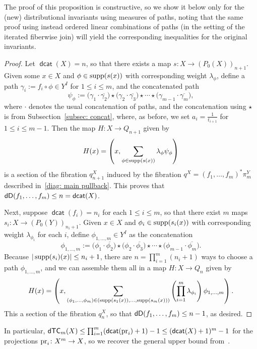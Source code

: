 \documentclass[amscd,amssymb,verbatim,10pt]{amsart}
\numberwithin{equation}{section}
\theoremstyle{plain}
\theoremstyle{definition}
\DeclareMathOperator{\supp}{{\rm supp}}
\DeclareMathOperator{\dcat}{{\mathsf{dcat}}}
\DeclareMathOperator{\dTC}{{\mathsf{dTC}}}
\def\pr{\protect\operatorname{pr}}
\newcommand{\dD}{{\sf {dD}}}
\def\ov{\overline}
\begin{document}
The proof of this proposition is constructive, so we show it below only for the (new) distributional invariants using measures of paths, noting that the same proof using instead ordered linear combinations of paths (in the setting of the iterated fiberwise join) will yield the corresponding inequalities for the original invariants.
\begin{proof}
    Let $\dcat(X)=n$, so that there exists a map $s\colon X\to (P_0(X))_{n+1}$. Given some $x\in X$ and $\phi\in \supp(s(x))$ with corresponding weight $\lambda_\phi$, define a path $\gamma_{i}:=f_i\circ\phi\in Y^I$ for $1\le i \le m$, and the concatenated path
    \[
\psi_{\phi}:=\bigl(\gamma_{1}\cdot\ov{\gamma_{2}}\bigr)\star\bigl(\gamma_{2}\cdot\ov{\gamma_{3}}\bigr)\star\cdots\star\bigl(\gamma_{{m-1}}\cdot\ov{\gamma_{m}}\bigr),
    \]
    where $\cdot$ denotes the usual concatenation of paths, and the concatenation using $\star$ is from Subsection~\ref{subsec: concat}, where, as before, we set $a_i=\tfrac{1}{t_{i+1}}$ for $1\le i \le m-1$. Then the map $H\colon X\to Q_{n+1}$ given by 
    \[
H(x)=\left(x,\sum_{\phi\in\supp(s(x))}\lambda_{\phi}\psi_{\phi}\right)
    \]
    is a section of the fibration $q^X_{n+1}$ induced by the fibration $q^X=(f_1,\dots,f_m)^*\pi^Y_m$ described in~\eqref{diag: main pullback}. This proves that $\dD(f_1,\dots,f_m)\le n=\dcat(X)$.

    Next, suppose $\dcat(f_i)=n_i$ for each $1\le i \le m$, so that there exist $m$ maps $s_i\colon X\to (P_0(Y))_{n_i+1}$. Given $x\in X$ and $\phi_i\in \supp(s_i(x))$ with corresponding weight $\lambda_{\phi_i}$ for each $i$, define $\phi_{1,\dots,m}\in Y^I$ as the concatenation
    \[
\phi_{1,\dots,m}:=\bigl(\phi_{1}\cdot\ov{\phi_{2}}\bigr)\star\bigl(\phi_{2}\cdot\ov{\phi_{3}}\bigr)\star\cdots\star\bigl(\phi_{{m-1}}\cdot\ov{\phi_{m}}\bigr).
    \]
Because $|\supp(s_i)(x)| \leq n_i+1$, there are $n=\prod_{i=1}^m(n_i+1)$ ways to choose
a path $\phi_{1,\ldots,m}$, and we can assemble them all in a map $H\colon X\to Q_{n}$ given by 
    \[
H(x)=\left(x,\sum_{(\phi_1,\dots,\phi_m)\in(\supp(s_1(x)),\dots,\supp(s_m(x)))}\left(\prod_{i=1}^m\lambda_{\phi_i}\right)\phi_{1,\dots,m}\right).
    \]
    This a section of the fibration $q^X_{n}$, so that $\dD(f_1,\dots,f_m)\le n-1$, as desired.
\end{proof}

In particular, $\dTC_m(X)\le \prod_{i=1}^m(\dcat(\pr_i)+1)-1\le(\dcat(X)+1)^m-1$ for the projections $\pr_i\colon X^m\to X$, so we recover the general upper bound from~\cite{Ja1}.
\end{document}
